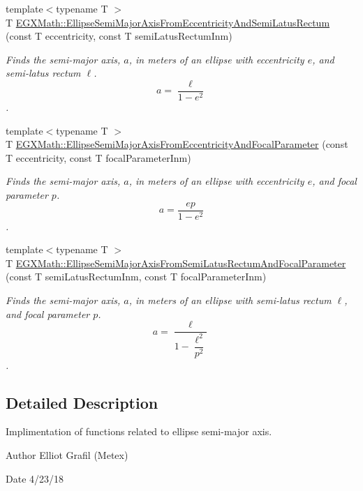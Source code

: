 \begin{DoxyCompactItemize}
{\footnotesize template$<$typename T $>$ }\\T \mbox{\hyperlink{group___e_g_x_math-_geometry-2_d-_ellipse-_semi_major_axis_ga00e19efce15b74c6556cbd5650d7f699}{E\+G\+X\+Math\+::\+Ellipse\+Semi\+Major\+Axis\+From\+Eccentricity\+And\+Semi\+Latus\+Rectum}} (const T eccentricity, const T semi\+Latus\+Rectum\+Inm)
\begin{DoxyCompactList}\small\item\em Finds the semi-\/major axis, $a$, in meters of an ellipse with eccentricity $e$, and semi-\/latus rectum $\ell$. \[ a=\dfrac{\ell}{1 - e^2} \]. \end{DoxyCompactList}\item 
{\footnotesize template$<$typename T $>$ }\\T \mbox{\hyperlink{group___e_g_x_math-_geometry-2_d-_ellipse-_semi_major_axis_ga77845ca288672da90567f533679e7024}{E\+G\+X\+Math\+::\+Ellipse\+Semi\+Major\+Axis\+From\+Eccentricity\+And\+Focal\+Parameter}} (const T eccentricity, const T focal\+Parameter\+Inm)
\begin{DoxyCompactList}\small\item\em Finds the semi-\/major axis, $a$, in meters of an ellipse with eccentricity $e$, and focal parameter $p$. \[ a=\dfrac{ep}{1-e^2} \]. \end{DoxyCompactList}\item 
{\footnotesize template$<$typename T $>$ }\\T \mbox{\hyperlink{group___e_g_x_math-_geometry-2_d-_ellipse-_semi_major_axis_gaea152a91fc8eb6532f497e9d25f0477c}{E\+G\+X\+Math\+::\+Ellipse\+Semi\+Major\+Axis\+From\+Semi\+Latus\+Rectum\+And\+Focal\+Parameter}} (const T semi\+Latus\+Rectum\+Inm, const T focal\+Parameter\+Inm)
\begin{DoxyCompactList}\small\item\em Finds the semi-\/major axis, $a$, in meters of an ellipse with semi-\/latus rectum $\ell$, and focal parameter $p$. \[ a=\dfrac{\ell}{1-\dfrac{\ell^2}{p^2}} \]. \end{DoxyCompactList}\end{DoxyCompactItemize}


\subsection{Detailed Description}
Implimentation of functions related to ellipse semi-\/major axis. 

\begin{DoxyAuthor}{Author}
Elliot Grafil (Metex) 
\end{DoxyAuthor}
\begin{DoxyDate}{Date}
4/23/18 
\end{DoxyDate}
